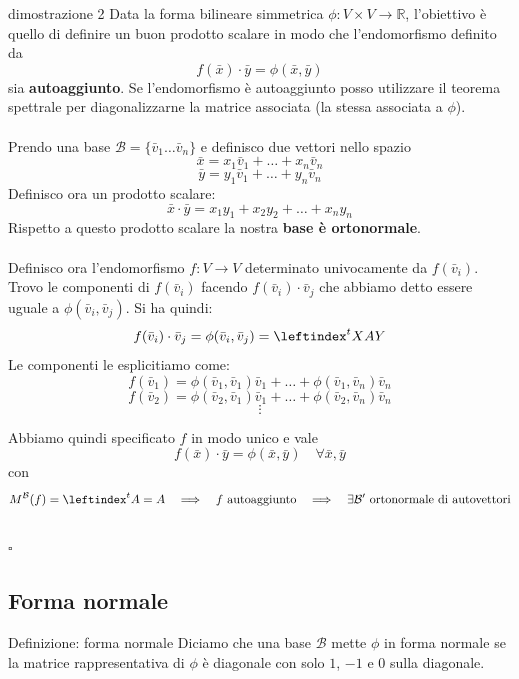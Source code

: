 \documentclass[x11names]{article}
\newcommand*{\QEDB}{\null\nobreak\hfill\ensuremath{\square}}%
\begin{document}
\begin{es}{dimostrazione 2}
	Data la forma bilineare simmetrica $\phi : V \times V \to \mathbb{R}$, l'obiettivo è quello di definire un buon prodotto scalare in modo che  l'endomorfismo definito da
	\[
	f(\bar{x}) \cdot \bar{y} = \phi(\bar{x},\bar{y})
	\]
	sia \textbf{autoaggiunto}. Se l'endomorfismo è autoaggiunto posso utilizzare il teorema spettrale per diagonalizzarne la matrice associata (la stessa associata a $\phi$). \\ \\
	
	\noindent
	Prendo una base $\mathcal{B} = \{\bar{v}_{1} \dots \bar{v}_{n}\}$ e definisco due vettori nello spazio
	\[
	\bar{x} = x_{1}\bar{v}_{1}+ \dots +x_{n}\bar{v}_{n}
	\]
	\[
	\bar{y} = y_{1}\bar{v}_{1}+ \dots +y_{n}\bar{v}_{n}
	\]
	Definisco ora un prodotto scalare:
	\[
	\bar{x} \cdot \bar{y} = x_{1}y_{1} + x_{2}y_{2} + \dots + x_{n}y_{n}
	\]
	Rispetto a questo prodotto scalare la nostra \textbf{base è ortonormale}. \\ \\
	
	
	\noindent
	Definisco ora l'endomorfismo $f:V\to V$ determinato univocamente da $f(\bar{v}_{i})$. Trovo le componenti di $f(\bar{v}_{i})$  facendo $f(\bar{v}_{i}) \cdot \bar{v}_{j}$ che abbiamo detto essere uguale a $\phi (\bar{v}_{i}, \bar{v}_{j})$. Si ha quindi:
	\[
	f(\bar{v}_{i})\cdot \bar{v}_{j} = \phi (\bar{v}_{i},\bar{v}_{j}) = \leftindex^{t}{X}AY
	\]
	Le componenti le esplicitiamo come:
	\[
	f(\bar{v}_{1})  = \phi(\bar{v}_{1},\bar{v}_{1}) \bar{v}_{1} + \dots + \phi(\bar{v}_{1},\bar{v}_{n})\bar{v}_{n}
	\]
	\[
	f(\bar{v}_{2})  = \phi(\bar{v}_{2},\bar{v}_{1}) \bar{v}_{1} + \dots + \phi(\bar{v}_{2},\bar{v}_{n})\bar{v}_{n}
	\]
	\[
	\vdots
	\]
	
	Abbiamo quindi specificato $f$ in modo unico e vale
	\[
	f(\bar{x})\cdot \bar{y} = \phi(\bar{x},\bar{y}) \quad \forall \bar{x},\bar{y} 
	\]
	con
	\[
	M^\mathcal{B}(f) = \leftindex^{t}{A} = A \quad \Longrightarrow \quad f \text{ autoaggiunto} \quad \Longrightarrow \quad \exists \mathcal{B}' \text{ ortonormale di autovettori}
	\]
	\\
	\QEDB
\end{es}

\subsection{Forma normale}
	\begin{center}
	\colorbox{myblue}{\begin{minipage}{5.75in}
			\begin{blues}{Definizione: forma normale}
			Diciamo  che una base $\mathcal{B}$ mette $\phi$ in forma normale se la matrice rappresentativa di $\phi$ è diagonale con solo $1$, $-1$ e $0$ sulla diagonale.
				
			\end{blues}
	\end{minipage}}       
\end{center}
\end{document}
